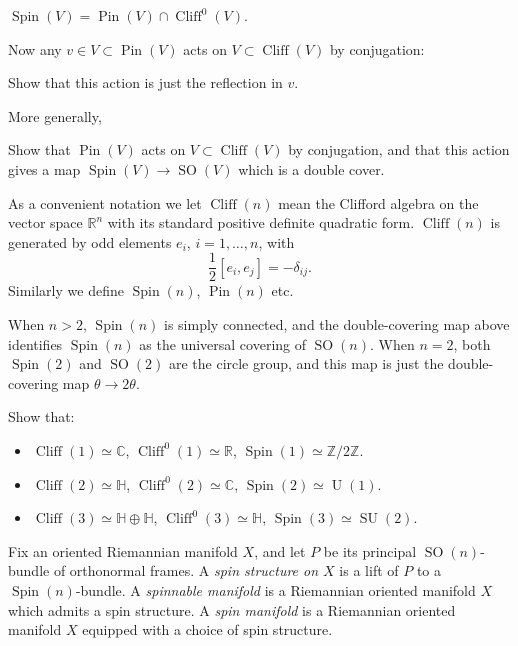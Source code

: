 \documentclass[12pt,letterpaper,reqno]{article}
\numberwithin{equation}{section}
\newcommand{\R}{\ensuremath{\mathbb R}}
\newcommand{\C}{\ensuremath{\mathbb C}}
\newcommand{\Z}{\ensuremath{\mathbb Z}}
\newcommand{\bbH}{\ensuremath{\mathbb H}}
\newcommand{\half}{\ensuremath{\frac{1}{2}}}
\newcommand{\ti}[1]{\textit{#1}}
\DeclareMathOperator{\Pin}{Pin}
\DeclareMathOperator{\Spin}{Spin}
\DeclareMathOperator{\SO}{SO}
\DeclareMathOperator{\SU}{SU}
\DeclareMathOperator{\U}{U}
\DeclareMathOperator{\Cliff}{Cliff}
\begin{document}
\begin{defn} $\Spin(V) = \Pin(V) \cap \Cliff^0(V)$.
\end{defn}

Now any $v \in V \subset \Pin(V)$ acts on $V \subset \Cliff(V)$
by conjugation:
\begin{exercise}
Show that this action is just the reflection in $v$.
\end{exercise}
More generally,
\begin{exercise} Show that $\Pin(V)$ acts on $V \subset \Cliff(V)$ 
by conjugation, and that this action gives a map $\Spin(V) \to \SO(V)$ which 
is a double cover.
\end{exercise}

As a convenient notation we let $\Cliff(n)$ mean the Clifford algebra on the
vector space $\R^n$ with its standard positive definite quadratic form.
$\Cliff(n)$ is generated by odd elements $e_i$, $i = 1, \dots, n$, with 
\begin{equation}
  \half [e_i, e_j] = -\delta_{ij}.
\end{equation}
Similarly we define $\Spin(n)$, $\Pin(n)$ etc.

When $n > 2$, $\Spin(n)$ is simply connected, and the 
double-covering map above identifies
$\Spin(n)$ as the universal covering of $\SO(n)$. When $n=2$, both $\Spin(2)$
and $\SO(2)$ are the circle group, and this map is just the double-covering
map $\theta \to 2 \theta$.

\begin{exercise} Show that:
\begin{itemize}
\item $\Cliff(1) \simeq \C$, $\Cliff^0(1) \simeq \R$, $\Spin(1) \simeq \Z / 2\Z$.
\item $\Cliff(2) \simeq \bbH$, $\Cliff^0(2) \simeq \C$, $\Spin(2) \simeq \U(1)$.
\item $\Cliff(3) \simeq \bbH \oplus \bbH$, $\Cliff^0(3) \simeq \bbH$, $\Spin(3) \simeq \SU(2)$.
\end{itemize}
\end{exercise}

\begin{defn} Fix an oriented Riemannian manifold $X$, 
and let $P$ be its principal $\SO(n)$-bundle
of orthonormal frames. A \ti{spin structure on $X$} is a lift of $P$ to a $\Spin(n)$-bundle.
A \ti{spinnable manifold} is a Riemannian oriented manifold $X$ which
admits a spin structure.
A \ti{spin manifold} is a Riemannian oriented manifold $X$ 
equipped with a choice of spin structure.
\end{defn}
\end{document}
